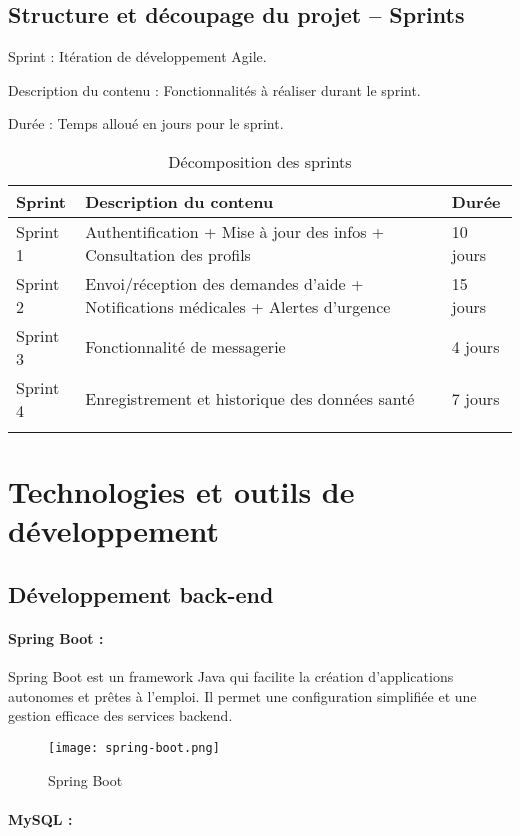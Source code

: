 \documentclass[12pt,a4paper]{report}
\begin{document}
\subsection{Structure et découpage du projet – Sprints}
\item Sprint : Itération de développement Agile.
\item Description du contenu : Fonctionnalités à réaliser durant le sprint.
\item Durée : Temps alloué en jours pour le sprint.
\begin{longtable}{|p{2.5cm}|p{9cm}|p{3cm}|}
\hline
\textbf{Sprint} & \textbf{Description du contenu} & \textbf{Durée} \\
\hline
Sprint 1 & Authentification + Mise à jour des infos + Consultation des profils & 10 jours \\
\hline
Sprint 2 & Envoi/réception des demandes d’aide + Notifications médicales + Alertes d’urgence & 15 jours \\
\hline
Sprint 3 & Fonctionnalité de messagerie & 4 jours \\
\hline
Sprint 4 & Enregistrement et historique des données santé & 7 jours \\
\hline
\caption{Décomposition des sprints }
\label{sprints}
\end{longtable}
\section{Technologies et outils de développement}

\subsection{Développement back-end}

\paragraph{Spring Boot :}

Spring Boot est un framework Java qui facilite la création d'applications autonomes et prêtes à l'emploi. Il permet une configuration simplifiée et une gestion efficace des services backend.
\begin{figure}[H] 
    \centering
    \texttt{[image: spring-boot.png]}
    \caption{Spring Boot}
    \label{fig:springboot}
\end{figure}

\paragraph{MySQL :}
\end{document}

